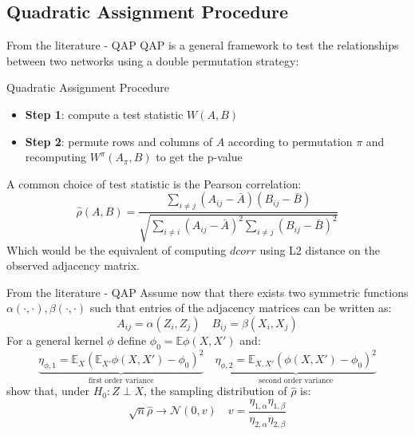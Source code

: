 \documentclass[10.5pt]{beamer}
\begin{document}



\subsection{Quadratic Assignment Procedure}

\begin{frame}{From the literature - QAP}
QAP is a general framework to test the relationships between two networks using a double permutation strategy: 
\begin{block}{Quadratic Assignment Procedure}
\begin{itemize}
\setlength{\itemsep}{.5em}
    \item \textbf{Step 1}: compute a test statistic $W(A, B)$ 
    \item \textbf{Step 2}: permute rows and columns of $A$ according to permutation $\pi$ and recomputing $W^\pi(A_\pi, B)$ to get the p-value
\end{itemize}
\end{block}
\pause

A common choice of test statistic is the Pearson correlation:
\[
\hat{\rho}(A, B) = \frac{\sum_{i\neq j}(A_{ij}-\bar{A})(B_{ij}-\bar{B})}{\sqrt{\sum_{i\neq i}(A_{ij}-\bar{A})^{2}\sum_{i\neq j}(B_{ij}-\bar{B})^{2}}}
\]
Which would be the equivalent of computing $dcorr$ using L2 distance on the observed adjacency matrix.
\end{frame}

\begin{frame}{From the literature - QAP}
Assume now that there exists two symmetric functions $\alpha(\cdot, \cdot), \beta(\cdot, \cdot)$ such that entries of the adjacency matrices can be written as:
\[
A_{ij} = \alpha(Z_i, Z_j)\quad B_{ij}= \beta(X_i, X_j)
\]
For a general kernel $\phi$ define $\phi_0=\mathbb{E}\phi(X, X')$ and:
\[
\underbrace{\eta_{\phi, 1} = \mathbb{E}_X\left(\mathbb{E}_{X'}\phi(X, X')-\phi_0 \right)^2}_{\text{first order variance}} \quad \underbrace{\eta_{\phi, 2} = \mathbb{E}_{X, X'}\left(\phi(X, X')-\phi_0 \right)^2}_{\text{second order variance}}
\]
\citet{shi_asymptotic_2025} show that, under $H_0: Z\perp X$, the sampling distribution of $\hat{\rho}$ is:
\[
\sqrt{n}\hat{\rho}\to \mathcal{N}\left(0, v\right) \quad v = \frac{\eta_{1, \alpha}\eta_{1, \beta}}{\eta_{2, \alpha}\eta_{2, \beta}}
\]

\end{frame}
\end{document}
